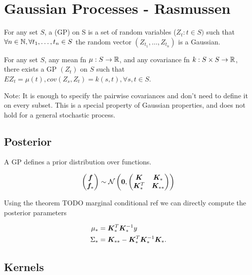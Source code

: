 \chapter{Gaussian Processes - Rasmussen}

\begin{defn}
    For any set $S$, a  (GP) on S is a set of random variables ($Z_t : t \in S)$ such that $\forall n \in {\mathbb{N}}, \forall t_1, \dots, t_n \in S$ the random vector $(Z_{t_1}, \dots, Z_{t_n})$ is a Gaussian.
\end{defn}

\begin{thm}
    For any set $S$, any mean fn $\mu : S \rightarrow {\mathbb{R}}$, and any covariance fn $k : S \times S \rightarrow {\mathbb{R}}$, there exists a GP $(Z_t)$ on $S$ such that $E Z_t = \mu(t), cov(Z_s, Z_t) = k(s, t), \forall s,t \in S$.
\end{thm}

Note: It is enough to specify the pairwise covariances and don't need to define it on every subset. This is a special property of Gaussian properties, and does not hold for a general stochastic process. 

\section{Posterior}

A GP defines a prior distribution over functions. 

\begin{equation}
    \begin{pmatrix}{\bm{f}} \\ {\bm{f}}_*\end{pmatrix} \sim {\mathcal{N}} \left({\bm{0}}, \begin{pmatrix}{\bm{K}} & {\bm{K}}_* \\ {\bm{K}}^T_* & {\bm{K}}_{**} \end{pmatrix} \right)
\end{equation}

Using the theorem {TODO marginal conditional ref} we can directly compute the posterior parameters

\begin{align}
    \mu_* &= {\bm{K}}_*^T {\bm{K}}_*^{-1} y \\
    \Sigma_* &= {\bm{K}}_{**} - {\bm{K}}_*^T {\bm{K}}_*^{-1} {\bm{K}}_*.
\end{align}


\section{Kernels}


